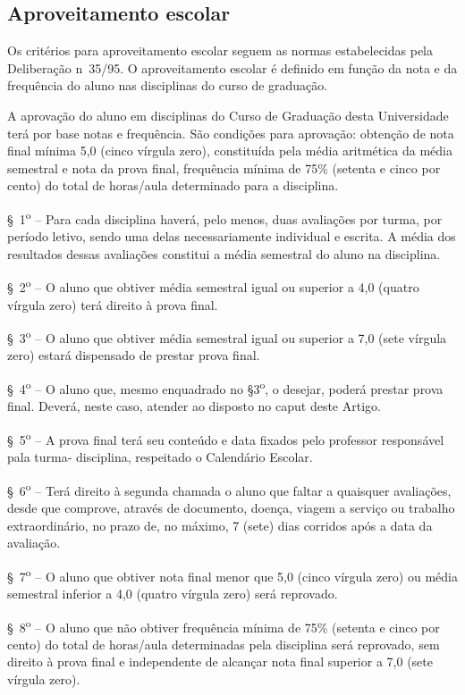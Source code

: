 \subsection{Aproveitamento escolar}
Os critérios para aproveitamento escolar seguem as normas estabelecidas pela Deliberação n\textordmasculine~35/95. O aproveitamento escolar é definido em função da nota e da frequência do aluno nas disciplinas do curso de graduação.
\begin{itquotation}
    \setcounter{artigo}{94}
    \artigo A aprovação do aluno em disciplinas do Curso de Graduação desta Universidade terá por base notas e frequência. São condições para aprovação: obtenção de nota final mínima 5,0 (cinco vírgula zero), constituída pela média aritmética da média semestral e nota da prova final, frequência mínima de 75\% (setenta e cinco por cento) do total de horas/aula determinado para a disciplina.

    \S~1\textsuperscript{o} -- Para cada disciplina haverá, pelo menos, duas avaliações por turma, por período letivo, sendo uma delas necessariamente individual e escrita. A média dos resultados dessas avaliações constitui a média semestral do aluno na disciplina.

    \S~2\textsuperscript{o} -- O aluno que obtiver média semestral igual ou superior a 4,0 (quatro vírgula zero) terá direito à prova final.

    \S~3\textsuperscript{o} -- O aluno que obtiver média semestral igual ou superior a 7,0 (sete vírgula zero) estará dispensado de prestar prova final.

    \S~4\textsuperscript{o} -- O aluno que, mesmo enquadrado no \S 3\textsuperscript{o}, o desejar, poderá prestar prova final. Deverá, neste caso, atender ao disposto no caput deste Artigo.

    \S~5\textsuperscript{o} -- A prova final terá seu conteúdo e data fixados pelo professor responsável pala turma-
    disciplina, respeitado o Calendário Escolar.

    \S~6\textsuperscript{o} -- Terá direito à segunda chamada o aluno que faltar a quaisquer avaliações, desde que
    comprove, através de documento, doença, viagem a serviço ou trabalho extraordinário, no prazo de,
    no máximo, 7 (sete) dias corridos após a data da avaliação.

    \S~7\textsuperscript{o} -- O aluno que obtiver nota final menor que 5,0 (cinco vírgula zero) ou média semestral inferior a 4,0 (quatro vírgula zero) será reprovado.

    \S~8\textsuperscript{o} -- O aluno que não obtiver frequência mínima de 75\% (setenta e cinco por cento) do total de horas/aula determinadas pela disciplina será reprovado, sem direito à prova final e independente de alcançar nota final superior a 7,0 (sete vírgula zero).
\end{itquotation}


